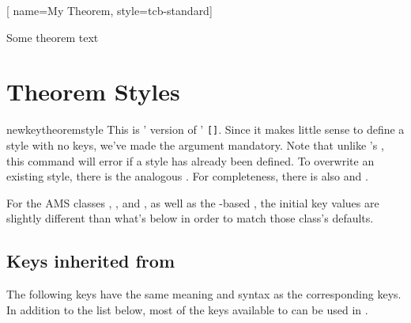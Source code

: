 \documentclass{ltxdoc}
\newcommand{\bracks}[1]{\texttt{[#1]}}
\begin{document}
\begin{tcbwritetemp}
[
  name=My Theorem,
  style=tcb-standard]
\end{tcbwritetemp}

\begin{keythmscode}[withpreamble]
\begin{mytheo}
Some theorem text
\end{mytheo}
\end{keythmscode}

\section{Theorem Styles}

\begin{docCommand}{newkeytheoremstyle}
  {}
This is ' version of ' \bracks{}.
Since it makes little sense to define a style with no keys, we've made the  argument mandatory.
Note that unlike 's , this command will error if a style has already been defined.
To overwrite an existing style, there is the analogous .
For completeness, there is also  and .
\end{docCommand}

\begin{notebox}
For the AMS classes , , and , as well as the -based , the initial key values are slightly different than what's below in order to match those class's defaults.
\end{notebox}

\subsection{Keys inherited from }

The following keys have the same meaning and syntax as the corresponding  keys.
In addition to the list below, most of the keys available to  can be used in .
\end{document}
